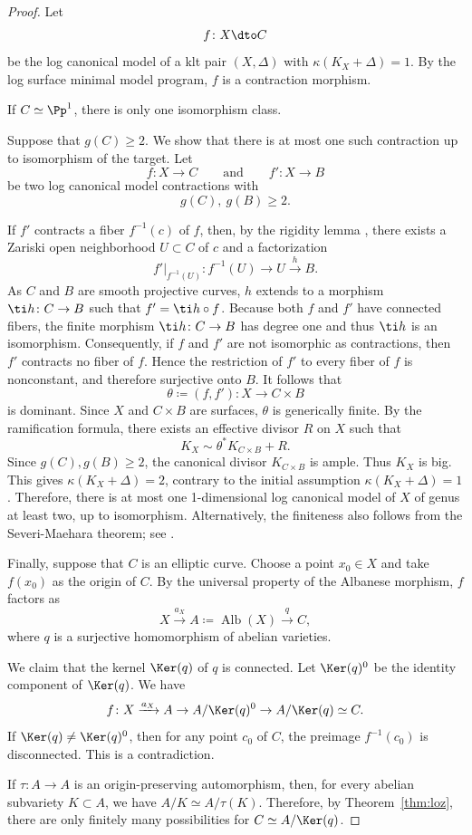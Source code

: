 \documentclass[12pt]{amsart}
\newcommand{\Alb}{\operatorname{Alb}}
\begin{document}
\begin{proof}
Let
\[
 f\colon X\dto C
\]
be the log canonical model of a klt pair $(X,\Delta)$ with $\kappa(K_X+\Delta)=1$. By the log surface minimal model program, $f$ is a contraction morphism.

If $C\simeq\Pp^1$, there is only one isomorphism class.

Suppose that \(g(C)\geq 2\). We show that there is at most one such
contraction up to isomorphism of the target. Let
\[
f\colon X\to C
\qquad\text{and}\qquad
f'\colon X\to B
\]
be two log canonical model contractions with
\[
g(C),~g(B)\geq 2.
\]

If $f'$ contracts a fiber $f^{-1}(c)$ of $f$, then, by the rigidity
lemma \cite[Lemma~1.15]{Deb01}, there exists a Zariski open
neighborhood $U\subset C$ of $c$ and a factorization
\[f'|_{f^{-1}(U)}\colon f^{-1}(U) \to U \xrightarrow{h} B.\] As $C$ and $B$ are smooth projective curves, $h$ extends to a morphism $\ti h \colon C \to B$ such that $f'= \ti h \circ f$. Because both $f$ and $f'$ have connected fibers, the finite morphism $\ti h\colon C\to B$ has degree one and thus $\ti h$ is an isomorphism. Consequently, if \(f\) and \(f'\) are not isomorphic as contractions,
then \(f'\) contracts no fiber of \(f\). Hence the restriction of \(f'\)
to every fiber of \(f\) is nonconstant, and therefore surjective onto
\(B\). It follows that
\[
\theta\coloneqq(f,f')\colon X\to C\times B
\]
is dominant. Since \(X\) and \(C\times B\) are surfaces, \(\theta\)
is generically finite. By the ramification formula, there exists an effective divisor \(R\) on
\(X\) such that
\[
K_X\sim \theta^*K_{C\times B}+R.
\]
Since \(g(C),g(B)\geq 2\), the canonical
divisor \(K_{C\times B}\) is ample. Thus \(K_X\) is big.
This gives $\kappa(K_X+\Delta)=2$, contrary to the initial assumption $\kappa(K_X+\Delta)=1$. Therefore, there is at most one 1-dimensional log canonical model of $X$ of genus at least two, up to isomorphism. Alternatively, the finiteness also follows from the Severi-Maehara theorem; see \cite[Main Theorem]{Mae83}.

Finally, suppose that $C$ is an elliptic curve. Choose a point
$x_0\in X$ and take $f(x_0)$ as the origin of $C$. By the universal
property of the Albanese morphism, $f$ factors as
\[
X\xrightarrow{a_X}A\coloneqq\Alb(X)\xrightarrow{q}C,
\]
where $q$ is a surjective homomorphism of abelian varieties.

We claim that the kernel $\Ker(q)$ of $q$ is connected. Let $\Ker(q)^0$ be the identity component of $\Ker(q)$. We have 
\[
f\colon X \xrightarrow{a_X} A \to A/\Ker(q)^0 \to A/\Ker(q) \simeq C.
\] If $\Ker(q) \neq \Ker(q)^0$, then for any point $c_0$ of $C$, the preimage $f^{-1}(c_0)$ is disconnected. This is a contradiction.

If $\tau\colon A\to A$ is an origin-preserving automorphism, then, for every abelian subvariety
$K\subset A$, we have $A/K\simeq A/\tau(K)$. Therefore, by
Theorem~\ref{thm:loz}, there are only finitely many possibilities for
$C\simeq A/\Ker(q)$.
\end{proof}
\end{document}
